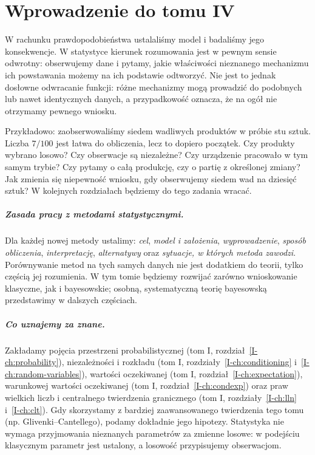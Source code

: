 \chapter*{Wprowadzenie do tomu IV}
W rachunku prawdopodobieństwa ustalaliśmy model i badaliśmy jego konsekwencje. W statystyce kierunek rozumowania jest w pewnym sensie odwrotny: obserwujemy dane i pytamy, jakie właściwości nieznanego mechanizmu ich powstawania możemy na ich podstawie odtworzyć. Nie jest to jednak dosłowne odwracanie funkcji: różne mechanizmy mogą prowadzić do podobnych lub nawet identycznych danych, a przypadkowość oznacza, że na ogół nie otrzymamy pewnego wniosku.

Przykładowo: zaobserwowaliśmy siedem wadliwych produktów w próbie stu sztuk. Liczba $7/100$ jest łatwa do obliczenia, lecz to dopiero początek. Czy produkty wybrano losowo? Czy obserwacje są niezależne? Czy urządzenie pracowało w tym samym trybie? Czy pytamy o całą produkcję, czy o partię z określonej zmiany? Jak zmienia się niepewność wniosku, gdy obserwujemy siedem wad na dziesięć sztuk? W kolejnych rozdziałach będziemy do tego zadania wracać.

\paragraph{Zasada pracy z metodami statystycznymi.}
Dla każdej nowej metody ustalimy: \emph{cel}, \emph{model i założenia}, \emph{wyprowadzenie}, \emph{sposób obliczenia}, \emph{interpretację}, \emph{alternatywy} oraz \emph{sytuacje, w których metoda zawodzi}. Porównywanie metod na tych samych danych nie jest dodatkiem do teorii, tylko częścią jej rozumienia. W tym tomie będziemy rozwijać zarówno wnioskowanie klasyczne, jak i bayesowskie; osobną, systematyczną teorię bayesowską przedstawimy w dalszych częściach.

\paragraph{Co uznajemy za znane.}
Zakładamy pojęcia przestrzeni probabilistycznej (tom I, rozdział~\ref{I-ch:probability}), niezależności i rozkładu (tom I, rozdziały~\ref{I-ch:conditioning} i~\ref{I-ch:random-variables}), wartości oczekiwanej (tom I, rozdział~\ref{I-ch:expectation}), warunkowej wartości oczekiwanej (tom I, rozdział~\ref{I-ch:condexp}) oraz praw wielkich liczb i centralnego twierdzenia granicznego (tom I, rozdziały~\ref{I-ch:lln} i~\ref{I-ch:clt}). Gdy skorzystamy z bardziej zaawansowanego twierdzenia tego tomu (np. Glivenki--Cantellego), podamy dokładnie jego hipotezy. Statystyka nie wymaga przyjmowania nieznanych parametrów za zmienne losowe: w podejściu klasycznym parametr jest ustalony, a losowość przypisujemy obserwacjom.


